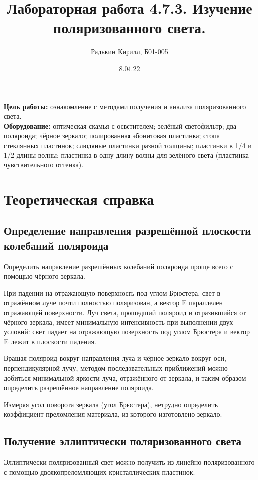 \documentclass[a4paper, 12pt]{article}
\author{Радькин Кирилл, Б01-005}
\date{8.04.22}
\title{Лабораторная работа 4.7.3. Изучение поляризованного света.}
\begin{document}
\maketitle
\thispagestyle{empty}
\newpage

\textbf{Цель работы:} ознакомление с методами получения и анализа поляризованного света.
\\

\textbf{Оборудование:} оптическая скамья с осветителем; зелёный светофильтр; два поляроида; чёрное зеркало; полированная эбонитовая пластинка; стопа стеклянных пластинок; слюдяные пластинки разной толщины; пластинки в 1/4 и 1/2 длины волны; пластинка
в одну длину волны для зелёного света (пластинка чувствительного
оттенка).

\section{Теоретическая справка}
\subsection{Определение направления разрешённой плоскости колебаний поляроида}
	
	Определить направление разрешённых колебаний поляроида проще всего с помощью чёрного зеркала.
	
При падении на отражающую поверхность под углом Брюстера, свет в отражённом луче почти полностью поляризован, а вектор E параллелен отражающей поверхности. Луч света, прошедший поляроид и отразившийся от чёрного зеркала, имеет минимальную интенсивность при выполнении двух условий: свет падает на отражающую поверхность под углом Брюстера и вектор E лежит в плоскости падения.

Вращая поляроид вокруг направления луча и чёрное зеркало вокруг оси, перпендикулярной лучу, методом последовательных приближений можно добиться минимальной яркости луча, отражённого от зеркала, и таким образом определить разрешённое направление поляроида.

Измеряя угол поворота зеркала (угол Брюстера), нетрудно определить коэффициент преломления материала, из которого изготовлено зеркало. 

\subsection{Получение эллиптически поляризованного света}

Эллиптически поляризованный свет можно получить из линейно поляризованного с помощью двоякопреломляющих кристаллических пластинок.
\end{document}
